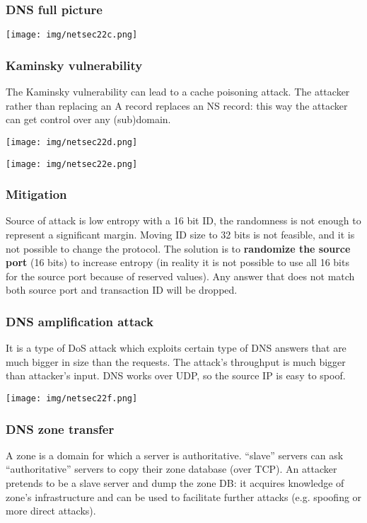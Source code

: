 \documentclass[a4paper, 10pt, titlepage]{article}
\begin{document}
\subsubsection*{DNS full picture}
\begin{center}
	\texttt{[image: img/netsec22c.png]}
\end{center}

\subsubsection{Kaminsky vulnerability}
The Kaminsky vulnerability can lead to a cache poisoning attack. The attacker rather than replacing an A record replaces an NS record: this way the attacker can get control over any
(sub)domain.
\begin{center}
	\texttt{[image: img/netsec22d.png]}
\end{center}
\begin{center}
	\texttt{[image: img/netsec22e.png]}
\end{center}

\subsubsection*{Mitigation}
Source of attack is low entropy with a 16 bit ID, the randomness is not enough to represent a significant margin. Moving ID size to 32 bits is not feasible, and it is not possible to change the protocol. The solution is to \textbf{randomize the source port} (16 bits) to increase entropy (in reality it is not possible to use all 16 bits for the source port because of reserved values). Any answer that does not match both source port and transaction ID will be dropped.

\subsubsection{DNS amplification attack}
It is a type of DoS attack which exploits certain type of DNS answers that are much bigger in size than the requests. The  attack’s throughput is much bigger than attacker’s input. DNS works over UDP, so the source IP is easy to spoof.
\begin{center}
	\texttt{[image: img/netsec22f.png]}
\end{center}

\subsubsection{DNS zone transfer}
A zone is a domain for which a server is authoritative. “slave” servers can ask “authoritative” servers to copy their zone database (over TCP). An attacker pretends to be a slave server and dump the zone DB: it acquires knowledge of zone’s infrastructure and can be used to facilitate further attacks (e.g. spoofing or more direct attacks).
\end{document}
